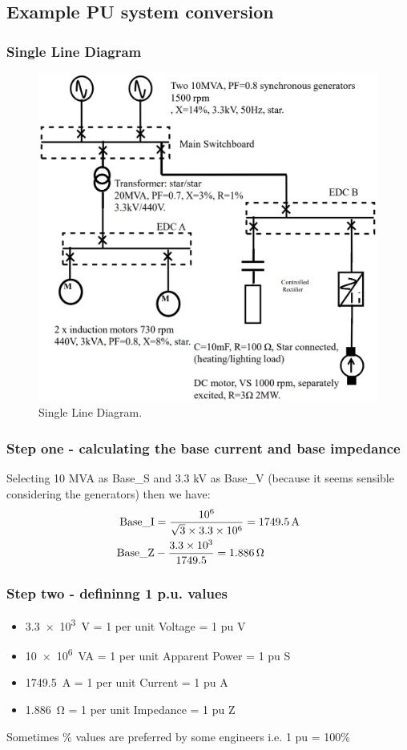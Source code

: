 \subsection{Example PU system conversion}
\subsubsection{Single Line Diagram}
\begin{figure}[H]
	\centering
	\includegraphics[width = \textwidth]{./img/figure12.png}
	\caption{Single Line Diagram.}
\end{figure}
\subsubsection{Step one - calculating the base current and base impedance}
Selecting 10 MVA as Base\_S and 3.3 kV as Base\_V (because it seems sensible considering the generators) then we have:
\begin{align}
	\textrm{Base\_I} & = \dfrac{10 \time 10^6}{\sqrt{3}\times 3.3 \times 10^6} = \SI{1749.5}{\ampere} \\
	\textrm{Base\_Z} & - \dfrac{3.3\times 10^3}{1749.5} = \SI{1.886}{\ohm}
\end{align}
\subsubsection{Step two - defininng 1 p.u. values}
\begin{itemize}
	\item \SI{3.3e3}{\volt} = 1 per unit Voltage = 1 pu V
	\item \SI{10e6}{VA} = 1 per unit Apparent Power = 1 pu S
	\item \SI{1749.5}{\ampere} = 1 per unit Current = 1 pu A
	\item \SI{1.886}{\ohm} = 1 per unit Impedance = 1 pu Z
\end{itemize}
Sometimes \% values are preferred by some engineers i.e. 1 pu = 100\%
